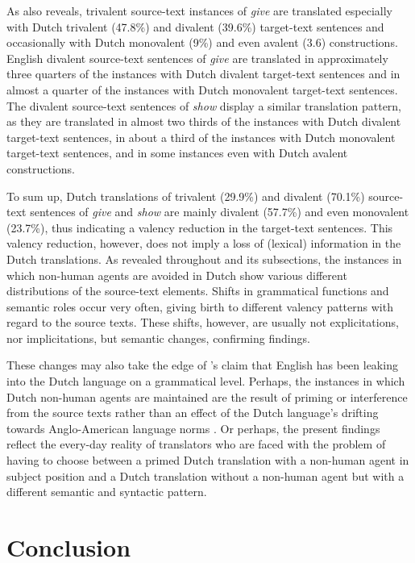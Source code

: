 \documentclass[output=paper]{LSP/langsci}
\begin{document}
As  also reveals, trivalent source-text instances of \textit{give} are translated especially with Dutch trivalent (47.8\%) and divalent (39.6\%) target-text sentences and occasionally with Dutch monovalent (9\%) and even avalent (3.6) constructions. English divalent source-text sentences of \textit{give} are translated in approximately three quarters of the instances with Dutch divalent target-text sentences and in almost a quarter of the instances with Dutch monovalent target-text sentences. The divalent source-text sentences of \textit{show} display a similar translation pattern, as they are translated in almost two thirds of the instances with Dutch divalent target-text sentences, in about a third of the instances with Dutch monovalent target-text sentences, and in some instances even with Dutch avalent constructions.

To sum up, Dutch translations of trivalent (29.9\%) and divalent (70.1\%) source-text sentences of \textit{give} and \textit{show} are mainly divalent (57.7\%) and even monovalent (23.7\%), thus indicating a valency reduction in the target-text sentences. This valency reduction, however, does not imply a loss of (lexical) information in the Dutch translations. As revealed throughout  and its subsections, the instances in which non-human agents are avoided in Dutch show various different distributions of the source-text elements. Shifts in grammatical functions and semantic roles occur very often, giving birth to different valency patterns with regard to the source texts. These shifts, however, are usually not explicitations, nor implicitations, but semantic changes, confirming \citep{Vandepitte2007} findings.

These changes may also take the edge of \citeauthor{Delsoir2011}'s \citeyear{Delsoir2011} claim that English has been leaking into the Dutch language on a grammatical level. Perhaps, the instances in which Dutch non-human agents are maintained are the result of priming \citep[e.g.][]{Vandepitte2011,Delsoir2011} or interference from the source texts rather than an effect of the Dutch language’s drifting towards Anglo-American language norms \citep[ e.g.][]{House2008}. Or perhaps, the present findings reflect the every-day reality of translators who are faced with the problem of having to choose between a primed Dutch translation with a non-human agent in subject position and a Dutch translation without a non-human agent but with a different semantic and syntactic pattern. 

\section{Conclusion}
\end{document}
